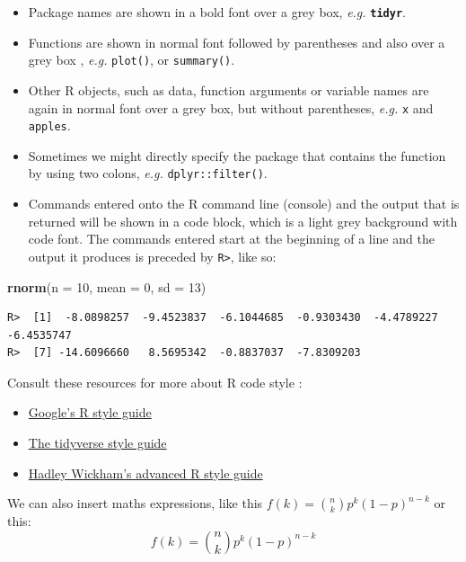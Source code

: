 \documentclass[
]{book}
\newenvironment{Shaded}{\begin{snugshade}}{\end{snugshade}}
\newcommand{\DataTypeTok}[1]{\textcolor[rgb]{0.13,0.29,0.53}{#1}}
\newcommand{\DecValTok}[1]{\textcolor[rgb]{0.00,0.00,0.81}{#1}}
\newcommand{\KeywordTok}[1]{\textcolor[rgb]{0.13,0.29,0.53}{\textbf{#1}}}
\newcommand{\NormalTok}[1]{#1}
\providecommand{\tightlist}{%
  \setlength{\itemsep}{0pt}\setlength{\parskip}{0pt}}
\begin{document}
\begin{itemize}
\tightlist
\item
  Package names are shown in a bold font over a grey box, \emph{e.g.} \textbf{\texttt{tidyr}}.
\item
  Functions are shown in normal font followed by parentheses and also over a grey box , \emph{e.g.} \texttt{plot()}, or \texttt{summary()}.
\item
  Other R objects, such as data, function arguments or variable names are again in normal font over a grey box, but without parentheses, \emph{e.g.} \texttt{x} and \texttt{apples}.
\item
  Sometimes we might directly specify the package that contains the function by using two colons, \emph{e.g.} \texttt{dplyr::filter()}.
\item
  Commands entered onto the R command line (console) and the output that is returned will be shown in a code block, which is a light grey background with code font. The commands entered start at the beginning of a line and the output it produces is preceded by \texttt{R\textgreater{}}, like so:
\end{itemize}

\begin{Shaded}
\begin{Highlighting}[]
\KeywordTok{rnorm}\NormalTok{(}\DataTypeTok{n =} \DecValTok{10}\NormalTok{, }\DataTypeTok{mean =} \DecValTok{0}\NormalTok{, }\DataTypeTok{sd =} \DecValTok{13}\NormalTok{)}
\end{Highlighting}
\end{Shaded}

\begin{verbatim}
R>  [1]  -8.0898257  -9.4523837  -6.1044685  -0.9303430  -4.4789227  -6.4535747
R>  [7] -14.6096660   8.5695342  -0.8837037  -7.8309203
\end{verbatim}

Consult these resources for more about R code style :

\begin{itemize}
\tightlist
\item
  \href{https://google.github.io/styleguide/Rguide.xml}{Google's R style guide}
\item
  \href{http://style.tidyverse.org}{The tidyverse style guide}
\item
  \href{http://adv-r.had.co.nz/Style.html}{Hadley Wickham's advanced R style guide}
\end{itemize}

We can also insert maths expressions, like this \(f(k) = {n \choose k} p^{k} (1-p)^{n-k}\) or this: \[f(k) = {n \choose k} p^{k} (1-p)^{n-k}\]
\end{document}
